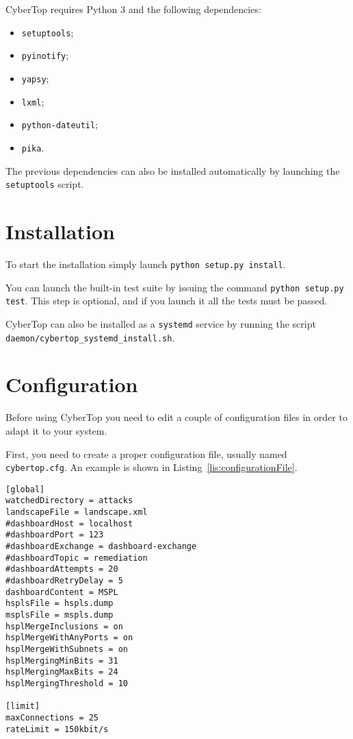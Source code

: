 \documentclass{scrartcl}
\begin{document}
CyberTop requires Python 3 and the following dependencies:

\begin{itemize}
	\item \lstinline|setuptools|;
	\item \lstinline|pyinotify|;
	\item \lstinline|yapsy|;
	\item \lstinline|lxml|;
	\item \lstinline|python-dateutil|;
	\item \lstinline|pika|.
\end{itemize}

The previous dependencies can also be installed automatically by launching the \lstinline|setuptools| script.

\section{Installation}

To start the installation simply launch \lstinline|python setup.py install|.

You can launch the built-in test suite by issuing the command \lstinline|python setup.py test|. This step is optional, and if you launch it all the tests must be passed.

CyberTop can also be installed as a \lstinline|systemd| service by running the script \lstinline|daemon/cybertop_systemd_install.sh|.

\section{Configuration}

Before using CyberTop you need to edit a couple of configuration files in order to adapt it to your system.

First, you need to create a proper configuration file, usually named \lstinline|cybertop.cfg|. An example is shown in Listing~\ref{lis:configurationFile}.

\begin{lstlisting}[caption = Example of configuration file., label = lis:configurationFile]
[global]
watchedDirectory = attacks
landscapeFile = landscape.xml
#dashboardHost = localhost
#dashboardPort = 123
#dashboardExchange = dashboard-exchange
#dashboardTopic = remediation
#dashboardAttempts = 20
#dashboardRetryDelay = 5
dashboardContent = MSPL
hsplsFile = hspls.dump
msplsFile = mspls.dump
hsplMergeInclusions = on
hsplMergeWithAnyPorts = on
hsplMergeWithSubnets = on
hsplMergingMinBits = 31
hsplMergingMaxBits = 24
hsplMergingThreshold = 10

[limit]
maxConnections = 25
rateLimit = 150kbit/s
\end{lstlisting}
\end{document}
